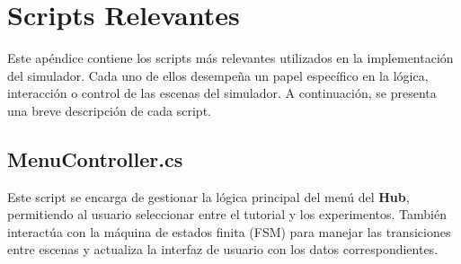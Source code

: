 \chapter{Scripts Relevantes}\label{app:Scripts}
Este apéndice contiene los scripts más relevantes utilizados en la implementación del simulador. Cada uno de ellos desempeña un papel específico en la lógica, interacción o control de las escenas del simulador. A continuación, se presenta una breve descripción de cada script.
\section{MenuController.cs}\label{script:MenuController}
Este script se encarga de gestionar la lógica principal del menú del \textbf{Hub}, permitiendo al usuario seleccionar entre el tutorial y los experimentos. También interactúa con la máquina de estados finita (FSM) para manejar las transiciones entre escenas y actualiza la interfaz de usuario con los datos correspondientes.
